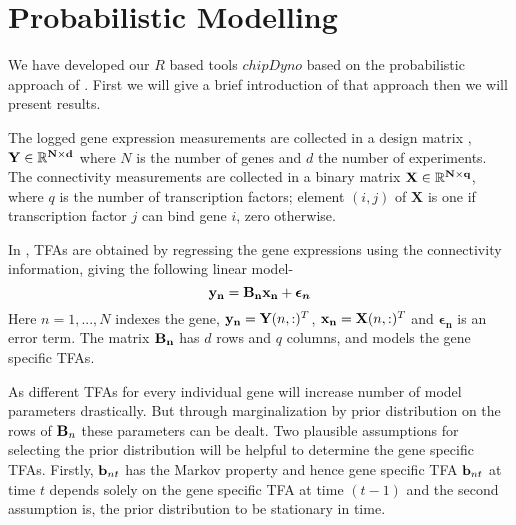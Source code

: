 



\section{Probabilistic Modelling}
We have developed our $R$ based tools $chipDyno$ based on the probabilistic approach of \cite{Sanguinetti:2006}.
First we will give a brief introduction of that approach then we will present results.

The logged gene expression measurements are collected in a design matrix , 
$\bold{Y} \in \mathbb{R} ^ { \bold{N} \times \bold{d} }$
where $N$ is the number of genes and $d$ the number of experiments. The connectivity measurements are collected 
in a binary matrix
$\bold{X} \in \mathbb{R} ^ {\bold{N} \times \bold{q}}$, 
where $q$ is the number of transcription factors; element $(i, j)$ of $\textbf{X}$ is one 
if transcription factor $j$ can bind gene $i$, zero otherwise.

In \cite{Sanguinetti:2006}, TFAs are obtained by regressing the gene expressions using the 
connectivity information, giving the following linear model- 
\begin{equation} \label{eq:linear_model_TFA}
\bold{y_{n}} = \bold{B_{n}} \bold{x_{n}} + \boldsymbol{\epsilon_{n}}
\end{equation}
Here $n = 1, . . . ,N$ indexes the gene, $\bold{y_{n}}=\bold{Y}(n,:)^T $,
$\bold{x_{n}}=\bold{X}(n,:)^T$ and $\boldsymbol{\epsilon_{n}}$ is an error term. 
The matrix $\bold{B_{n}}$ has $d$ rows and $q$ columns, and models the gene specific TFAs.

As different TFAs for every individual gene will increase number of model parameters drastically. But through
marginalization by prior distribution on the rows of $\bold{B}_n$ these parameters can be dealt. Two plausible 
assumptions for selecting the prior distribution will be helpful to determine the gene specific TFAs.
Firstly, $\bold{b}_{nt}$ has the Markov property and hence gene specific TFA $\bold{b}_{nt} $ at time $t$ depends 
solely on the gene specific TFA at time $(t-1)$ and the second assumption is, the prior distribution to be 
stationary in time.

